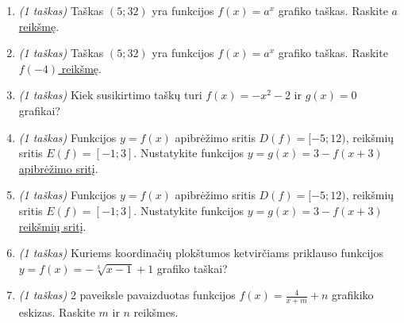 \documentclass[a4paper]{article}
\begin{document}
\begin{enumerate}
      \item \textit{(1 taškas)} Taškas $(5; 32)$ yra funkcijos $f(x)=a^x$
            grafiko taškas. Raskite \underline{$a$ reikšmę}.
            \vspace{7mm}

      \item \textit{(1 taškas)} Taškas $(5; 32)$ yra funkcijos $f(x)=a^x$
            grafiko taškas. Raskite \underline{$f(-4)$ reikšmę}.
            \vspace{7mm}

      \item \textit{(1 taškas)} Kiek susikirtimo taškų turi $f(x)=-x^2-2$ ir
            $g(x)=0$ grafikai?
            \vspace{7mm}

      \item \textit{(1 taškas)} Funkcijos $y=f(x)$ apibrėžimo sritis $D(f)=[-5;
                  12)$, reikšmių sritis $E(f)=[-1;3]$. Nustatykite funkcijos
            $y=g(x)=3-f(x+3)$
            \underline{apibrėžimo sritį}.
            \vspace{7mm}

      \item \textit{(1 taškas)} Funkcijos $y=f(x)$ apibrėžimo sritis $D(f)=[-5;
                  12)$, reikšmių sritis $E(f)=[-1;3]$. Nustatykite funkcijos
            $y=g(x)=3-f(x+3)$
            \underline{reikšmių sritį}.
            \vspace{7mm}

      \item \textit{(1 taškas)} Kuriems koordinačių plokštumos ketvirčiams
            priklauso funkcijos $y=f(x)=-\sqrt[3]{x-1}+1$ grafiko taškai?
            \vspace{7mm}

      \item \textit{(1 taškas)} 2 paveiksle pavaizduotas funkcijos
            $f(x)=\frac{4}{x+m}+n$ grafikiko eskizas. Raskite $m$ ir $n$
            reikšmes.
            \vspace{7mm}


            \begin{figure}[!htpb]
                  \centering
                  \begin{minipage}[]{0.5\linewidth}
                        \centering


\end{minipage}
\end{figure}
\end{enumerate}
\end{document}
